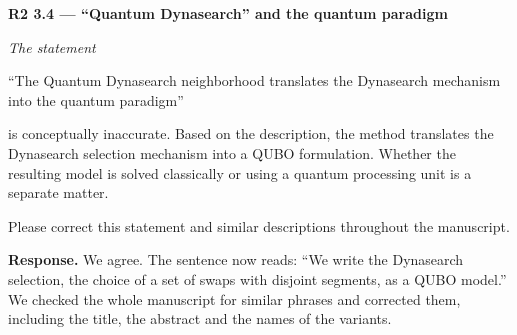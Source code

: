 \documentclass[12pt]{article}
\newenvironment{rc}[1]{\par\medskip\noindent\textbf{#1}\par\nopagebreak\noindent\itshape\renewcommand{\emph}[1]{\textbf{##1}}\ignorespaces}{\par}
\newcommand{\answer}[1]{\par\smallskip\noindent\textbf{Response.} #1\par}
\begin{document}
\begin{rc}{R2 3.4 --- ``Quantum Dynasearch'' and the quantum paradigm}
The statement

``The Quantum Dynasearch neighborhood translates the Dynasearch mechanism into the quantum paradigm''

is conceptually inaccurate. Based on the description, the method translates the Dynasearch selection mechanism into a QUBO formulation. Whether the resulting model is solved classically or using a quantum processing unit is a separate matter.

Please correct this statement and similar descriptions throughout the manuscript.
\end{rc}
\answer{We agree. The sentence now reads: ``We write the Dynasearch selection, the choice of a set of swaps with disjoint segments, as a QUBO model.'' We checked the whole manuscript for similar phrases and corrected them, including the title, the abstract and the names of the variants.}
\end{document}
